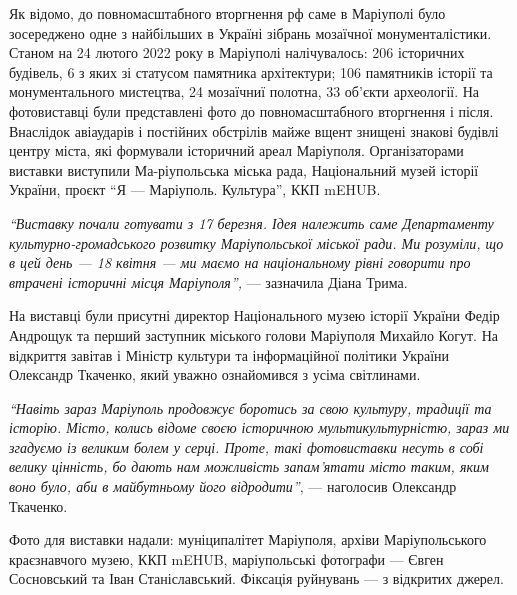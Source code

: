 Як відомо, до повномасштабного вторгнення рф саме в Маріуполі було зосереджено
одне з найбільших в Україні зібрань мозаїчної монументалістики. Станом на 24
лютого 2022 року в Маріуполі налічувалось: 206 історичних будівель, 6 з яких зі
статусом памятника архітектури; 106 памятників історії та монументального
мистецтва, 24 мозаїчниї полотна, 33 об'єкти археології. На фотовиставці були
представлені фото до повномасштабного вторгнення і після. Внаслідок авіаударів
і постійних обстрілів майже вщент знищені знакові будівлі центру міста, які
формували історичний ареал Маріуполя. Організаторами виставки виступили
Ма\hyp{}ріупольська міська рада, Національний музей історії України, проєкт \enquote{Я —
Маріуполь. Культура}, ККП mEHUB.

\begin{leftbar}
\emph{\enquote{Виставку почали готувати з 17 березня. Ідея належить саме Департаменту
культурно-громадського розвитку Маріупольської міської ради. Ми розуміли, що в
цей день — 18 квітня — ми маємо на національному рівні говорити про втрачені
історичні місця Маріуполя},} — зазначила Діана Трима.
\end{leftbar}


На виставці були присутні директор Національного музею історії України Федір
Андрощук та перший заступник міського голови Маріуполя Михайло Когут. На
відкриття завітав і Міністр культури та інформаційної політики України
Олександр Ткаченко, який уважно ознайомився з усіма світлинами. 

\begin{leftbar}
\emph{\enquote{Навіть зараз Маріуполь продовжує боротись за свою культуру, традиції та
історію. Місто, колись відоме своєю історичною мультикультурністю, зараз ми
згадуємо із великим болем у серці. Проте, такі фотовиставки несуть в собі
велику цінність, бо дають нам можливість запам'ятати місто таким, яким воно
було, аби в майбутньому його відродити}}, — наголосив Олександр Ткаченко. 
\end{leftbar}


Фото для виставки надали: муніципалітет Маріуполя, архіви Маріупольського
краєзнавчого музею, ККП mEHUB, маріупольські фотографи — Євген Сосновський та
Іван Станіславський. Фіксація руйнувань — з відкритих джерел.

